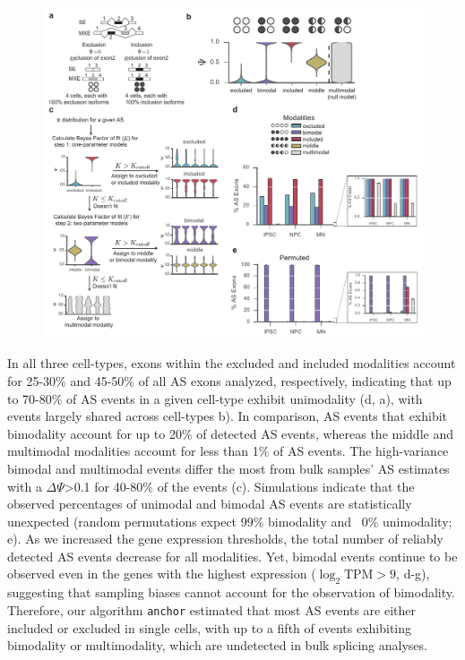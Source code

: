 \clearpage
\begin{figure}[h]
\ContinuedFloat
\captionsetup{labelformat=empty}
\centering
\includegraphics[width=5.8in]{figures/anchor_overview.pdf}
\end{figure}
\addtocounter{figure}{1}
\clearpage


In all three cell-types, exons within the excluded and included modalities account for 25-30\% and 45-50\% of all AS exons analyzed, respectively, indicating that up to 70-80\% of AS events in a given cell-type exhibit unimodality (d, a), with events largely shared across cell-types b). In comparison, AS events that exhibit bimodality account for up to 20\% of detected AS events, whereas the middle and multimodal modalities account for less than 1\% of AS events. The high-variance bimodal and multimodal events differ the most from bulk samples' AS estimates with a $\Delta\Psi$>0.1 for 40-80\% of the events (c). Simulations indicate that the observed percentages of unimodal and bimodal AS events are statistically unexpected (random permutations expect 99\% bimodality and ~0\% unimodality; e). As we increased the gene expression thresholds, the total number of reliably detected AS events decrease for all modalities. Yet, bimodal events continue to be observed even in the genes with the highest expression ($\log_2 \text{TPM} > 9$, d-g), suggesting that sampling biases cannot account for the observation of bimodality. Therefore, our algorithm \texttt{anchor} estimated that most AS events are either included or excluded in single cells, with up to a fifth of events exhibiting bimodality or multimodality, which are undetected in bulk splicing analyses. 




